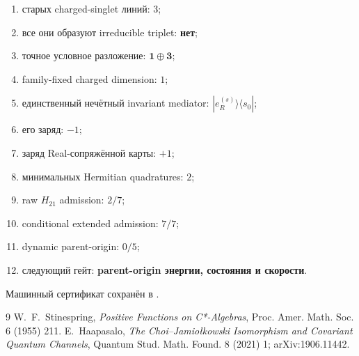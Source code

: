 \begin{protocol}\begin{enumerate}
\item старых charged-singlet линий: \textbf{$3$};
\item все они образуют irreducible triplet: \textbf{нет};
\item точное условное разложение: \textbf{$\mathbf1\oplus\mathbf3$};
\item family-fixed charged dimension: \textbf{$1$};
\item единственный нечётный invariant mediator: \textbf{$|e_R^{(s)}\rangle\langle s_0|$};
\item его заряд: \textbf{$-1$};
\item заряд Real-сопряжённой карты: \textbf{$+1$};
\item минимальных Hermitian quadratures: \textbf{$2$};
\item raw $H_{21}$ admission: \textbf{$2/7$};
\item conditional extended admission: \textbf{$7/7$};
\item dynamic parent-origin: \textbf{$0/5$};
\item следующий гейт: \textbf{parent-origin энергии, состояния и скорости}.
\end{enumerate}\end{protocol}

Машинный сертификат сохранён в
.

\begin{thebibliography}{9}
 W.~F.~Stinespring,
\emph{Positive Functions on C*-Algebras},
Proc. Amer. Math. Soc. 6 (1955) 211.
 E.~Haapasalo,
\emph{The Choi--Jamio\l{}kowski Isomorphism and Covariant Quantum Channels},
Quantum Stud. Math. Found. 8 (2021) 1; arXiv:1906.11442.
\end{thebibliography}